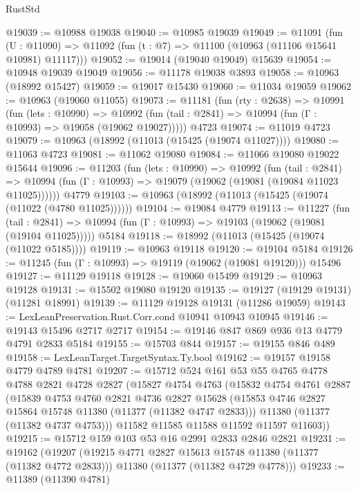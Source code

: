 \begin{lexlean}{RustStd}
\begin{coremodule}
@19039 := @10988 @19038
@19040 := @10985 @19039
@19049 := @11091
    (fun (U : @11090) => @11092 (fun (t : @7) => @11100 (@10963 (@11106 @15641 @10981) @11117)))
@19052 := @19014 (@19040 @19049) @15639
@19054 := @10948 @19039 @19049
@19056 := @11178 @19038 @3893
@19058 := @10963 (@18992 @15427)
@19059 := @19017 @15430
@19060 := @11034 @19059
@19062 := @10963 (@19060 @11055)
@19073 := @11181
    (fun (rty : @2638) =>
    @10991
      (fun (lets : @10990) =>
      @10992 (fun (tail : @2841) => @10994 (fun (Γ : @10993) => @19058 (@19062 @19027)))))
    @4723
@19074 := @11019 @4723
@19079 := @10963 (@18992 (@11013 (@15425 (@19074 @11027))))
@19080 := @11063 @4723
@19081 := @11062 @19080
@19084 := @11066 @19080 @19022 @15644
@19096 := @11203
    (fun (lets : @10990) =>
    @10992
      (fun (tail : @2841) =>
      @10994 (fun (Γ : @10993) => @19079 (@19062 (@19081 (@19084 @11023 @11025))))))
    @4779
@19103 := @10963 (@18992 (@11013 (@15425 (@19074 (@11022 (@4780 @11025))))))
@19104 := @19084 @4779
@19113 := @11227
    (fun (tail : @2841) => @10994 (fun (Γ : @10993) => @19103 (@19062 (@19081 (@19104 @11025)))))
    @5184
@19118 := @18992 (@11013 (@15425 (@19074 (@11022 @5185))))
@19119 := @10963 @19118
@19120 := @19104 @5184
@19126 := @11245 (fun (Γ : @10993) => @19119 (@19062 (@19081 @19120))) @15496
@19127 := @11129 @19118
@19128 := @19060 @15499
@19129 := @10963 @19128
@19131 := @15502 @19080 @19120
@19135 := @19127 (@19129 @19131) (@11281 @18991)
@19139 := @11129 @19128 @19131 (@11286 @19059)
@19143 := LexLeanPreservation.Rust.Corr.cond @10941 @10943 @10945
@19146 := @19143 @15496 @2717 @2717
@19154 := @19146 @847 @869 @936 @13 @4779 @4791 @2833 @5184
@19155 := @15703 @844
@19157 := @19155 @846 @489
@19158 := LexLeanTarget.TargetSyntax.Ty.bool
@19162 := @19157 @19158 @4779 @4789 @4781
@19207 := @15712
    @524
    @161
    @53
    @55
    @4765
    @4778
    @4788
    @2821
    @4728
    @2827
    (@15827
      @4754
      @4763
      (@15832
        @4754
        @4761
        @2887
        (@15839
          @4753
          @4760
          @2821
          @4736
          @2827
          @15628
          (@15853 @4746 @2827 @15864 @15748 @11380 (@11377 (@11382 @4747 @2833)))
          @11380
          (@11377 (@11382 @4737 @4753)))
        @11582
        @11585
        @11588
        @11592
        @11597
        @11603))
@19215 := @15712 @159 @103 @53 @16 @2991 @2833 @2846 @2821
@19231 := @19162
    (@19207
      (@19215 @4771 @2827 @15613 @15748 @11380 (@11377 (@11382 @4772 @2833)))
      @11380
      (@11377 (@11382 @4729 @4778)))
@19233 := @11389 (@11390 @4781)

\end{coremodule}
\end{lexlean}
